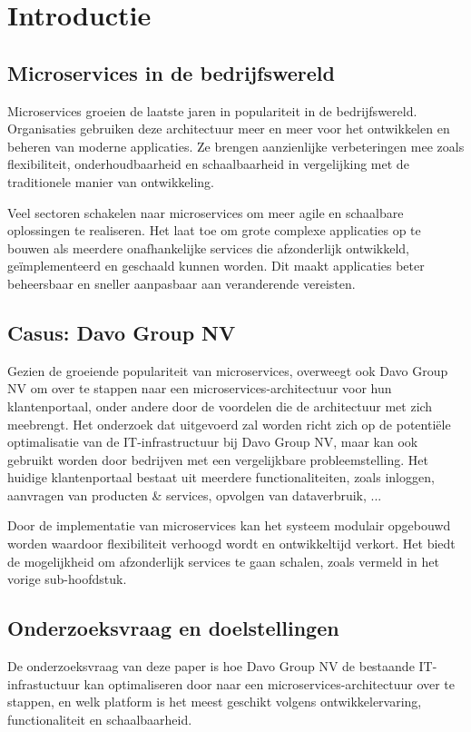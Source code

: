 
\section{Introductie}%
\label{sec:introductie}
\subsection{Microservices in de bedrijfswereld}
Microservices groeien de laatste jaren in populariteit in de bedrijfswereld. Organisaties gebruiken deze architectuur meer en meer voor het ontwikkelen en beheren van moderne applicaties. Ze brengen aanzienlijke verbeteringen mee zoals flexibiliteit, onderhoudbaarheid en schaalbaarheid in vergelijking met de traditionele manier van ontwikkeling.

Veel sectoren schakelen naar microservices om meer agile en schaalbare oplossingen te realiseren. Het laat toe om grote complexe applicaties op te bouwen als meerdere onafhankelijke services die afzonderlijk ontwikkeld, geïmplementeerd en geschaald kunnen worden. Dit maakt applicaties beter beheersbaar en sneller aanpasbaar aan veranderende vereisten.

\subsection{Casus: Davo Group NV}
Gezien de groeiende populariteit van microservices, overweegt ook Davo Group NV om over te stappen naar een microservices-architectuur voor hun klantenportaal, onder andere door de voordelen die de architectuur met zich meebrengt. Het onderzoek dat uitgevoerd zal worden richt zich op de potentiële optimalisatie van de IT-infrastructuur bij Davo Group NV, maar kan ook gebruikt worden door bedrijven met een vergelijkbare probleemstelling. Het huidige klantenportaal bestaat uit meerdere functionaliteiten, zoals inloggen, aanvragen van producten \& services, opvolgen van dataverbruik, ...

Door de implementatie van microservices kan het systeem modulair opgebouwd worden waardoor flexibiliteit verhoogd wordt en ontwikkeltijd verkort. Het biedt de mogelijkheid om afzonderlijk services te gaan schalen, zoals vermeld in het vorige sub-hoofdstuk.

\subsection{Onderzoeksvraag en doelstellingen}
De onderzoeksvraag van deze paper is hoe Davo Group NV de bestaande IT-infrastuctuur kan optimaliseren door naar een microservices-architectuur over te stappen, en welk platform is het meest geschikt volgens ontwikkelervaring, functionaliteit en schaalbaarheid.


